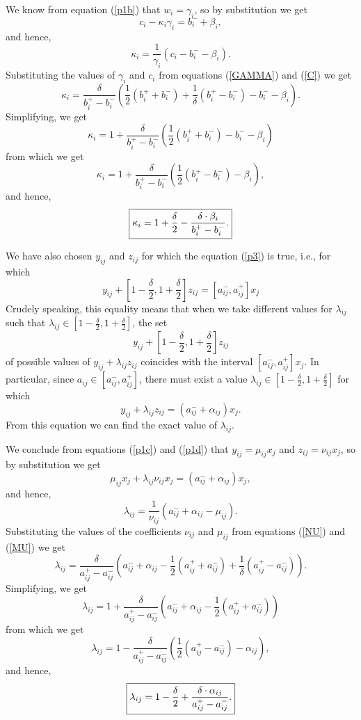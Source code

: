 We know from equation (\ref{p1b}) that $w_i=\gamma_i$, so by substitution we
get
$$
  c_i - \kappa_i \gamma_i = b_i^- + \beta_i,
$$
and hence,
$$
  \kappa_i=\frac{1}{\gamma_i}(c_i-b_i^--\beta_i).
$$
Substituting the values of $\gamma_i$ and $c_i$ from equations (\ref{GAMMA})
and (\ref{C}) we get
$$
  \kappa_i=\frac{\delta}{b_i^+-b_i^-}(\frac{1}{2}(b_i^++b_i^-) +
   \frac{1}{\delta}(b_i^+-b_i^-) - b_i^- - \beta_i).
$$
Simplifying, we get
$$
  \kappa_i=1+\frac{\delta}{b_i^+-b_i^-}(\frac{1}{2}(b_i^++b_i^-)-b_i^--\beta_i)
$$
from which we get
$$
  \kappa_i=1+\frac{\delta}{b_i^+-b_i^-}(\frac{1}{2}(b_i^+-b_i^-)-\beta_i),
$$
and hence,
\begin{equation}
  \fbox{${\displaystyle\kappa_i=1+\frac{\delta}{2}-
   \frac{\delta\cdot\beta_i}{b_i^+-b_i^-}.}$}                     \label{KAPPA}
\end{equation}

We have also chosen $y_{ij}$ and $z_{ij}$ for which the equation (\ref{p3}) is
true, i.e., for which
$$
  y_{ij} + [1 - \frac{\delta}{2}, 1 + \frac{\delta}{2}] z_{ij} =
   [a_{ij}^-, a_{ij}^+] x_j
$$
Crudely speaking, this equality means that when we take different values for
$\lambda_{ij}$ such that $\lambda_{ij}\in[1-{\displaystyle\frac{\delta}{2}},
1+{\displaystyle\frac{\delta}{2}}]$, the set
$$
  y_{ij} + [1 - \frac{\delta}{2}, 1 + \frac{\delta}{2}] z_{ij}
$$
of possible values of $y_{ij}+\lambda_{ij}z_{ij}$ coincides with the interval
$[a_{ij}^-, a_{ij}^+]x_j$. In particular, since $a_{ij}\in[a_{ij}^-,a_{ij}^+]$,
there must exist a value $\lambda_{ij}\in
[1-{\displaystyle\frac{\delta}{2}},1+{\displaystyle\frac{\delta}{2}}]$ for
which
$$
  y_{ij} + \lambda_{ij} z_{ij} = (a_{ij}^- + \alpha_{ij}) x_j.
$$
From this equation we can find the exact value of $\lambda_{ij}$.

We conclude from equations (\ref{p1c}) and (\ref{p1d}) that
$y_{ij}=\mu_{ij}x_j$ and $z_{ij}=\nu_{ij}x_j$, so by substitution we get
$$
  \mu_{ij} x_j + \lambda_{ij} \nu_{ij} x_j = (a_{ij}^- + \alpha_{ij}) x_j,
$$
and hence,
$$
  \lambda_{ij}=\frac{1}{\nu_{ij}}(a_{ij}^-+\alpha_{ij}-\mu_{ij}).
$$
Substituting the values of the coefficients $\nu_{ij}$ and $\mu_{ij}$ from
equations (\ref{NU}) and (\ref{MU}) we get
$$
  \lambda_{ij}=\frac{\delta}{a_{ij}^+-a_{ij}^-}(a_{ij}^-+\alpha_{ij}-
   \frac{1}{2}(a_{ij}^++a_{ij}^-) + \frac{1}{\delta}(a_{ij}^+-a_{ij}^-)).
$$
Simplifying, we get
$$
  \lambda_{ij}=1+\frac{\delta}{a_{ij}^+-a_{ij}^-}
   (a_{ij}^-+\alpha_{ij}-\frac{1}{2}(a_{ij}^++a_{ij}^-))
$$
from which we get
$$
  \lambda_{ij}=1-\frac{\delta}{a_{ij}^+-a_{ij}^-}
   (\frac{1}{2}(a_{ij}^+-a_{ij}^-)-\alpha_{ij}),
$$
and hence,
\begin{equation}
  \fbox{${\displaystyle\lambda_{ij}=1-\frac{\delta}{2}+
   \frac{\delta\cdot\alpha_{ij}}{a_{ij}^+-a_{ij}^-}.}$}          \label{LAMBDA}
\end{equation}

